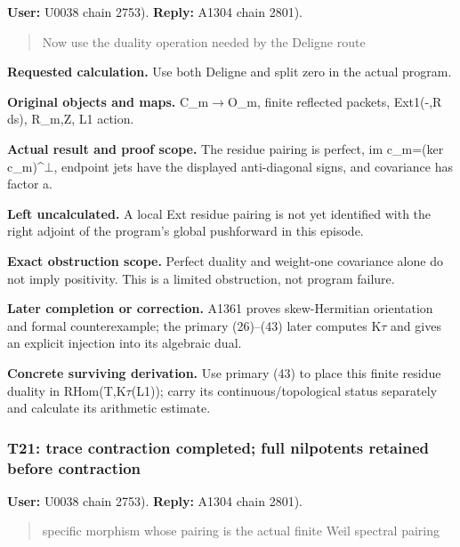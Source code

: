 \textbf{User:} U0038
\protect{} chain 2753).
\textbf{Reply:} A1304
\protect{} chain 2801).

\begin{quote}
Now use the duality operation needed by the Deligne route
\end{quote}

\textbf{Requested calculation.} Use both Deligne and split zero in the
actual program.

\textbf{Original objects and maps.}
C\_m\allowbreak{}\ensuremath{→}\allowbreak{}O\_m, finite reflected
packets, Ext1(-,R ds), R\_m,Z, L1 action.

\textbf{Actual result and proof scope.} The residue pairing is perfect,
im c\_m=(ker
c\_m)\textasciicircum{}\allowbreak{}\ensuremath{⊥}\allowbreak{},
endpoint jets have the displayed anti-diagonal signs, and covariance has
factor a.

\textbf{Left uncalculated.} A local Ext residue pairing is not yet
identified with the right adjoint of the program's global pushforward in
this episode.

\textbf{Exact obstruction scope.} Perfect duality and weight-one
covariance alone do not imply positivity. This is a limited obstruction,
not program failure.

\textbf{Later completion or correction.} A1361 proves skew-Hermitian
orientation and formal counterexample; the primary (26)--(43) later
computes K\allowbreak{}\ensuremath{τ}\allowbreak{} and gives an explicit
injection into its algebraic dual.

\textbf{Concrete surviving derivation.} Use primary (43) to place this
finite residue duality in
RHom(T,K\allowbreak{}\ensuremath{τ}\allowbreak{}(L1)); carry its
continuous/topological status separately and calculate its arithmetic
estimate.

\subsubsection{T21: trace contraction completed; full nilpotents
retained before
contraction}\label{TranscriptLedgerStage:t21-trace-contraction-completed-full-nilpotents-retained-before-contraction}

\textbf{User:} U0038
\protect{} chain 2753).
\textbf{Reply:} A1304
\protect{} chain 2801).

\begin{quote}
specific morphism whose pairing is the actual finite Weil spectral
pairing
\end{quote}

